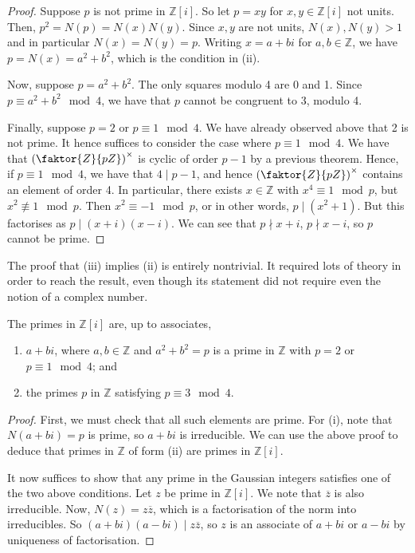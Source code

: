 \begin{proof}
	Suppose \( p \) is not prime in \( \mathbb Z[i] \).
	So let \( p = xy \) for \( x, y \in \mathbb Z[i] \) not units.
	Then, \( p^2 = N(p) = N(x)N(y) \).
	Since \( x, y \) are not units, \( N(x), N(y) > 1 \) and in particular \( N(x) = N(y) = p \).
	Writing \( x = a+bi \) for \( a, b \in \mathbb Z \), we have \( p = N(x) = a^2 + b^2 \), which is the condition in (ii).

	Now, suppose \( p = a^2 + b^2 \).
	The only squares modulo 4 are 0 and 1.
	Since \( p \equiv a^2 + b^2 \mod 4 \), we have that \( p \) cannot be congruent to 3, modulo 4.

	Finally, suppose \( p = 2 \) or \( p \equiv 1 \mod 4 \).
	We have already observed above that 2 is not prime.
	It hence suffices to consider the case where \( p \equiv 1 \mod 4 \).
	We have that \( \qty(\faktor{Z}{pZ})^\times \) is cyclic of order \( p-1 \) by a previous theorem.
	Hence, if \( p \equiv 1 \mod 4 \), we have that \( 4 \mid p-1 \), and hence \( \qty(\faktor{Z}{pZ})^\times \) contains an element of order 4.
	In particular, there exists \( x \in \mathbb Z \) with \( x^4 \equiv 1 \mod p \), but \( x^2 \not\equiv 1 \mod p \).
	Then \( x^2 \equiv -1 \mod p \), or in other words, \( p \mid (x^2 + 1) \).
	But this factorises as \( p \mid (x+i)(x-i) \).
	We can see that \( p \nmid x+i \), \( p \nmid x-i \), so \( p \) cannot be prime.
\end{proof}
\begin{remark}
	The proof that (iii) implies (ii) is entirely nontrivial.
	It required lots of theory in order to reach the result, even though its statement did not require even the notion of a complex number.
\end{remark}
\begin{theorem}
	The primes in \( \mathbb Z[i] \) are, up to associates,
	\begin{enumerate}
		\item \( a + bi \), where \( a, b \in \mathbb Z \) and \( a^2 + b^2 = p \) is a prime in \( \mathbb Z \) with \( p = 2 \) or \( p \equiv 1 \mod 4 \); and
		\item the primes \( p \) in \( \mathbb Z \) satisfying \( p \equiv 3 \mod 4 \).
	\end{enumerate}
\end{theorem}
\begin{proof}
	First, we must check that all such elements are prime.
	For (i), note that \( N(a+bi) = p \) is prime, so \( a+bi \) is irreducible.
	We can use the above proof to deduce that primes in \( \mathbb Z \) of form (ii) are primes in \( \mathbb Z[i] \).

	It now suffices to show that any prime in the Gaussian integers satisfies one of the two above conditions.
	Let \( z \) be prime in \( \mathbb Z[i] \).
	We note that \( \overline z \) is also irreducible.
	Now, \( N(z) = z\overline z \), which is a factorisation of the norm into irreducibles.
	So \( (a+bi)(a-bi) \mid z \overline z \), so \( z \) is an associate of \( a+bi \) or \( a-bi \) by uniqueness of factorisation.
\end{proof}
